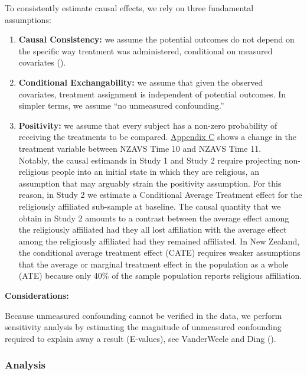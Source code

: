 \documentclass[
  singlecolumn]{article}
\begin{document}
To consistently estimate causal effects, we rely on three fundamental
assumptions:

\begin{enumerate}
\def\labelenumi{\arabic{enumi}.}
\item
  \textbf{Causal Consistency:} we assume the potential outcomes do not
  depend on the specific way treatment was administered, conditional on
  measured covariates ().
\item
  \textbf{Conditional Exchangability:} we assume that given the observed
  covariates, treatment assignment is independent of potential outcomes.
  In simpler terms, we assume ``no unmeasured confounding.''
\item
  \textbf{Positivity:} we assume that every subject has a non-zero
  probability of receiving the treatments to be compared.
  \hyperref[appendix-exposures]{Appendix C} shows a change in the
  treatment variable between NZAVS Time 10 and NZAVS Time 11.\\
  Notably, the causal estimands in Study 1 and Study 2 require
  projecting non-religious people into an initial state in which they
  are religious, an assumption that may arguably strain the positivity
  assumption. For this reason, in Study 2 we estimate a Conditional
  Average Treatment effect for the religiously affiliated sub-sample at
  baseline. The causal quantity that we obtain in Study 2 amounts to a
  contrast between the average effect among the religiously affiliated
  had they all lost affiliation with the average effect among the
  religiously affiliated had they remained affiliated. In New Zealand,
  the conditional average treatment effect (CATE) requires weaker
  assumptions that the average or marginal treatment effect in the
  population as a whole (ATE) because only 40\% of the sample population
  reports religious affiliation.
\end{enumerate}

\textbf{Considerations:}

Because unmeasured confounding cannot be verified in the data, we
perform sensitivity analysis by estimating the magnitude of unmeasured
confounding required to explain away a result (E-values), see
VanderWeele and Ding ().

\subsubsection{Analysis}\label{analysis}
\end{document}
